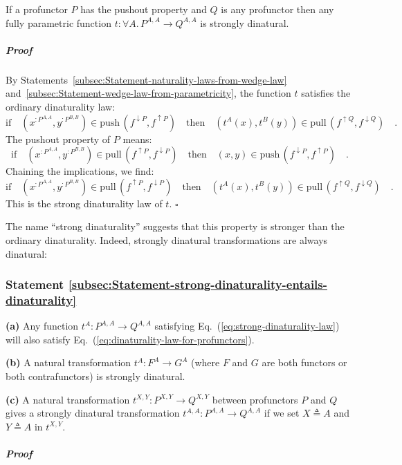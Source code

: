 If a profunctor $P$ has the pushout property and $Q$ is any profunctor
then any fully parametric function $t:\forall A.\,P^{A,A}\rightarrow Q^{A,A}$
is strongly dinatural.

\subparagraph{Proof}

By Statements~\ref{subsec:Statement-naturality-laws-from-wedge-law}
and~\ref{subsec:Statement-wedge-law-from-parametricity}, the function
$t$ satisfies the ordinary dinaturality law:
\[
\text{if}\quad(x^{:P^{A,A}},y^{:P^{B,B}})\in\text{push}\,(f^{\downarrow P},f^{\uparrow P})\quad\text{then}\quad(t^{A}(x),t^{B}(y))\in\text{pull}\,(f^{\uparrow Q},f^{\downarrow Q})\quad.
\]
The pushout property of $P$ means:
\[
\text{if}\quad(x^{:P^{A,A}},y^{:P^{B,B}})\in\text{pull}\,(f^{\uparrow P},f^{\downarrow P})\quad\text{then}\quad(x,y)\in\text{push}\,(f^{\downarrow P},f^{\uparrow P})\quad.
\]
Chaining the implications, we find:
\[
\text{if}\quad(x^{:P^{A,A}},y^{:P^{B,B}})\in\text{pull}\,(f^{\uparrow P},f^{\downarrow P})\quad\text{then}\quad(t^{A}(x),t^{B}(y))\in\text{pull}\,(f^{\uparrow Q},f^{\downarrow Q})\quad.
\]
This is the strong dinaturality law of $t$. $\square$

The name \textsf{``}strong dinaturality\textsf{''} suggests that this property is
stronger than the ordinary dinaturality. Indeed, strongly dinatural
transformations are always dinatural:

\subsubsection{Statement \label{subsec:Statement-strong-dinaturality-entails-dinaturality}\ref{subsec:Statement-strong-dinaturality-entails-dinaturality}}

\textbf{(a)} Any function $t^{A}:P^{A,A}\rightarrow Q^{A,A}$ satisfying
Eq.~(\ref{eq:strong-dinaturality-law}) will also satisfy Eq.~(\ref{eq:dinaturality-law-for-profunctors}).

\textbf{(b)} A natural transformation $t^{A}:F^{A}\rightarrow G^{A}$
(where $F$ and $G$ are both functors or both contrafunctors) is
strongly dinatural.

\textbf{(c)} A natural transformation $t^{X,Y}:P^{X,Y}\rightarrow Q^{X,Y}$
between profunctors $P$ and $Q$ gives a strongly dinatural transformation
$t^{A,A}:P^{A,A}\rightarrow Q^{A,A}$ if we set $X\triangleq A$ and
$Y\triangleq A$ in $t^{X,Y}$.

\subparagraph{Proof}

